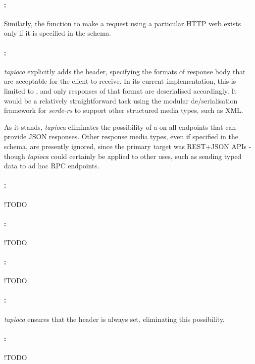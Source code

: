 \paragraph{:} Similarly, the function to make a request using a particular HTTP verb exists only if it is specified in the schema.

\paragraph{:} \emph{tapioca} explicitly adds the  header, specifying the formats of response body that are acceptable for the client to receive. In its current implementation, this is limited to , and only responses of that format are deserialised accordingly. It would be a relatively straightforward task using the modular de/serialisation framework for \emph{serde-rs} to support other structured media types, such as XML.

As it stands, \emph{tapioca} eliminates the possibility of a  on all endpoints that can provide JSON responses. Other response media types, even if specified in the schema, are presently ignored, since the primary target was REST+JSON APIs - though \emph{tapioca} could certainly be applied to other uses, such as sending typed data to ad hoc RPC endpoints.

\paragraph{:} !TODO

\paragraph{:} !TODO

\paragraph{:} !TODO

\paragraph{:} \emph{tapioca} ensures that the  header is always set, eliminating this possibility.

\paragraph{:} !TODO

